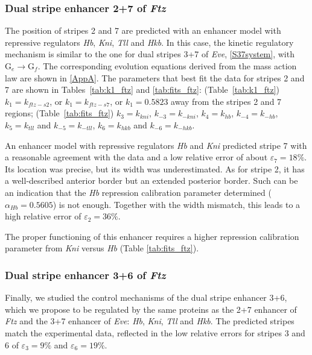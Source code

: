 \documentclass[final,authoryear, 5p, times]{elsarticle}
\begin{document}
\subsubsection{Dual stripe enhancer 2+7 of \textit{Ftz}}

The position of stripes 2 and 7 are predicted with an enhancer model with repressive regulators \textit{Hb}, \textit{Kni},  \textit{Tll} and \textit{Hkb}. In this case, the kinetic regulatory mechanism is similar to the one for dual stripes 3+7 of \textit{Eve}, \eqref{S37system}, with $\text{G}_e\to \text{G}_f$.
The corresponding evolution equations derived from the mass action law are shown in \ref{AppA}. The parameters that best fit the data for stripes 2 and 7 are shown in Tables~\ref{tab:k1_ftz} and \ref{tab:fits_ftz}:
 (Table~\ref{tab:k1_ftz}) $k_1=k_{ftz-s2}$, or $k_1=k_{ftz-s7}$, or {$k_1=0.5823$ away from the stripes 2 and 7 regions}; (Table~\ref{tab:fits_ftz}) $k_3=k_{kni}$, $k_{-3}=k_{-kni}$, $k_4=k_{hb}$, $k_{-4}=k_{-hb}$, $k_5=k_{tll}$ and $k_{-5}=k_{-tll}$, $k_6=k_{hkb}$ and $k_{-6}=k_{-hkb}$.

An enhancer model with repressive regulators \textit{Hb} and \textit{Kni} predicted stripe 7 with a reasonable agreement with the data and a low relative error of about $\varepsilon_7=18\%$. Its location was precise, but its width was underestimated. As for stripe 2, it has a well-described anterior border but an extended posterior border. Such can be an indication that the \textit{Hb} repression calibration parameter determined ($\alpha_{Hb} = 0.5605$) is not enough. Together with the width mismatch, this leads to a high relative error of $\varepsilon_2=36\%$. 

The proper functioning of this enhancer requires a higher repression calibration parameter from \textit{Kni} versus \textit{Hb} (Table \ref{tab:fits_ftz}).



\subsubsection{Dual stripe enhancer 3+6 of \textit{Ftz}}

Finally, we studied the control mechanisms of the dual stripe enhancer 3+6, which we propose to be regulated by the same proteins as the 2+7 enhancer of \textit{Ftz} and the 3+7 enhancer of \textit{Eve}: \textit{Hb}, \textit{Kni}, \textit{Tll} and \textit{Hkb}. The predicted stripes match the experimental data, reflected in the low relative errors for stripes 3 and 6 of $\varepsilon_3=9\%$ and $\varepsilon_6=19\%$. 
\end{document}

